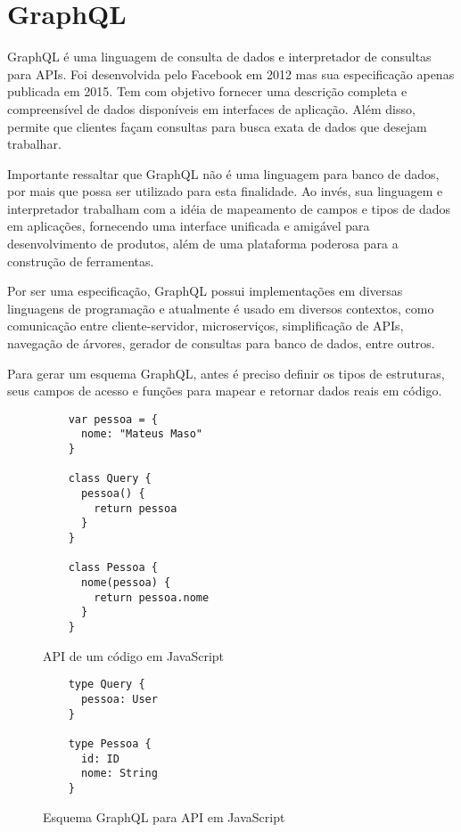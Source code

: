 \section{GraphQL}

GraphQL é uma linguagem de consulta de dados e interpretador de consultas para APIs. Foi desenvolvida pelo Facebook em 2012 mas sua especificação apenas publicada em 2015. Tem com objetivo fornecer uma descrição completa e compreensível de dados disponíveis em interfaces de aplicação. Além disso, permite que clientes façam consultas para busca exata de dados que desejam trabalhar. \cite{GraphQL2016}

Importante ressaltar que GraphQL não é uma linguagem para banco de dados, por mais que possa ser utilizado para esta finalidade. Ao invés, sua linguagem e interpretador trabalham com a idéia de mapeamento de campos e tipos de dados em aplicações, fornecendo uma interface unificada e amigável para desenvolvimento de produtos, além de uma plataforma poderosa para a construção de ferramentas. \cite{GraphQL2016}

Por ser uma especificação, GraphQL possui implementações em diversas linguagens de programação e atualmente é usado em diversos contextos, como comunicação entre cliente-servidor, microserviços, simplificação de APIs, navegação de árvores, gerador de consultas para banco de dados, entre outros.

Para gerar um esquema GraphQL, antes é preciso definir os tipos de estruturas, seus campos de acesso e funções para mapear e retornar dados reais em código.

\begin{figure}[H]
  \centering
  \begin{verbatim}
    var pessoa = {
      nome: "Mateus Maso"
    }

    class Query {
      pessoa() {
        return pessoa
      }
    }

    class Pessoa {
      nome(pessoa) {
        return pessoa.nome
      }
    }
  \end{verbatim}
  \caption{API de um código em JavaScript}
\end{figure}

\begin{figure}[H]
  \centering
  \begin{verbatim}
    type Query {
      pessoa: User
    }

    type Pessoa {
      id: ID
      nome: String
    }
  \end{verbatim}
  \caption{Esquema GraphQL para API em JavaScript}
\end{figure}

